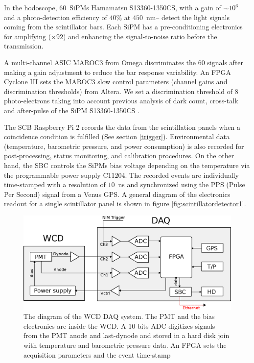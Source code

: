 \documentclass[letterpaper,11pt]{article}
\begin{document}
In the hodoscope, $60$~SiPMs Hamamatsu S13360-1350CS, with a gain of $\sim 10^6$ and a photo-detection efficiency of $40\%$ at $450$~nm-- detect the light signals coming from the scintillator bars. Each SiPM has a pre-conditioning electronics for amplifying ($\times 92$) and enhancing the signal-to-noise ratio before the transmission. 

A multi-channel ASIC MAROC3 from Omega discriminates the $60$ 
signals after making a gain adjustment to reduce the bar response variability. An FPGA Cyclone III sets the MAROC3 slow control parameters (channel gains and discrimination thresholds) from Altera. We set a discrimination threshold of $8$ photo-electrons taking into account previous analysis of dark count, cross-talk and after-pulse of the SiPM S13360-1350CS \cite{Villafrades2020}.

The SCB Raspberry Pi 2 records the data from the scintillation panels when a coincidence condition is fulfilled (See section \ref{trigger}). Environmental data (temperature, barometric pressure, and power consumption) is also recorded for post-processing, status monitoring, and calibration procedures. On the other hand, the SBC controls the SiPMs bias voltage depending on the temperature via the programmable power supply C11204. The recorded events are individually time-stamped with a resolution of $10$~ns and synchronized using the PPS (Pulse Per Second) signal from a Venus GPS. A general diagram of the electronics readout for a single scintillator panel is shown in figure \ref{fig:scintillatordetector1}.

\begin{figure}[htb]
\centering
\includegraphics[width=0.9\columnwidth]{Figures/WCDDAQ.eps}
\caption{The diagram of the WCD DAQ system. The PMT and the bias electronics are inside the WCD. A 10 bits ADC digitizes signals from the PMT anode and last-dynode and stored in a hard disk join with temperature and barometric pressure data. An FPGA sets the acquisition parameters and the event time-stamp}
  \label{fig:WCD}
\end{figure}
\end{document}
